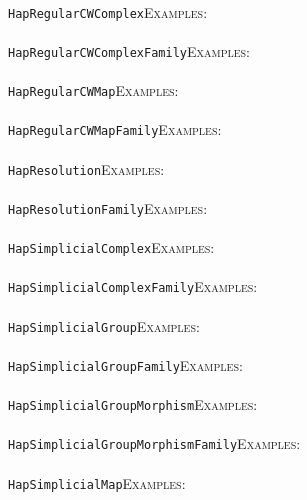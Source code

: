 \documentclass[a4paper,11pt]{report}
\begin{document}
{{ \\
 \texttt{HapRegularCWComplex}{\nobreakspace}{\nobreakspace}{\nobreakspace}{\nobreakspace}\textsc{Examples:} \\
 \\
 \texttt{HapRegularCWComplexFamily}{\nobreakspace}{\nobreakspace}{\nobreakspace}{\nobreakspace}\textsc{Examples:} \\
 \\
 \texttt{HapRegularCWMap}{\nobreakspace}{\nobreakspace}{\nobreakspace}{\nobreakspace}\textsc{Examples:} \\
 \\
 \texttt{HapRegularCWMapFamily}{\nobreakspace}{\nobreakspace}{\nobreakspace}{\nobreakspace}\textsc{Examples:} \\
 \\
 \texttt{HapResolution}{\nobreakspace}{\nobreakspace}{\nobreakspace}{\nobreakspace}\textsc{Examples:} \\
 \\
 \texttt{HapResolutionFamily}{\nobreakspace}{\nobreakspace}{\nobreakspace}{\nobreakspace}\textsc{Examples:} \\
 \\
 \texttt{HapSimplicialComplex}{\nobreakspace}{\nobreakspace}{\nobreakspace}{\nobreakspace}\textsc{Examples:} \\
 \\
 \texttt{HapSimplicialComplexFamily}{\nobreakspace}{\nobreakspace}{\nobreakspace}{\nobreakspace}\textsc{Examples:} \\
 \\
 \texttt{HapSimplicialGroup}{\nobreakspace}{\nobreakspace}{\nobreakspace}{\nobreakspace}\textsc{Examples:} \\
 \\
 \texttt{HapSimplicialGroupFamily}{\nobreakspace}{\nobreakspace}{\nobreakspace}{\nobreakspace}\textsc{Examples:} \\
 \\
 \texttt{HapSimplicialGroupMorphism}{\nobreakspace}{\nobreakspace}{\nobreakspace}{\nobreakspace}\textsc{Examples:} \\
 \\
 \texttt{HapSimplicialGroupMorphismFamily}{\nobreakspace}{\nobreakspace}{\nobreakspace}{\nobreakspace}\textsc{Examples:} \\
 \\
 \texttt{HapSimplicialMap}{\nobreakspace}{\nobreakspace}{\nobreakspace}{\nobreakspace}\textsc{Examples:} \\
 \\
}}
\end{document}
